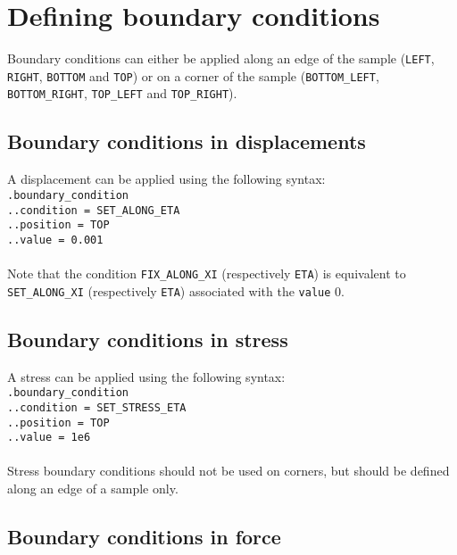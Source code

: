 \documentclass[10pt]{article}
\begin{document}
\section{Defining boundary conditions}

Boundary conditions can either be applied along an edge of the sample (\verb+LEFT+, \verb+RIGHT+, \verb+BOTTOM+ and \verb+TOP+) or on a corner of the sample (\verb+BOTTOM_LEFT+, \verb+BOTTOM_RIGHT+, \verb+TOP_LEFT+ and \verb+TOP_RIGHT+).

\subsection{Boundary conditions in displacements}

A displacement can be applied using the following syntax:\\

\noindent \verb+.boundary_condition+\\
\verb+..condition = SET_ALONG_ETA+\\
\verb+..position = TOP+\\
\verb+..value = 0.001+

\paragraph{}Note that the condition \verb+FIX_ALONG_XI+ (respectively \verb+ETA+) is equivalent to \verb+SET_ALONG_XI+ (respectively \verb+ETA+) associated with the \verb+value+ 0.

\subsection{Boundary conditions in stress}

A stress can be applied using the following syntax:\\

\noindent \verb+.boundary_condition+\\
\verb+..condition = SET_STRESS_ETA+\\
\verb+..position = TOP+\\
\verb+..value = 1e6+

\paragraph{}Stress boundary conditions should not be used on corners, but should be defined along an edge of a sample only.

\subsection{Boundary conditions in force}
\end{document}
